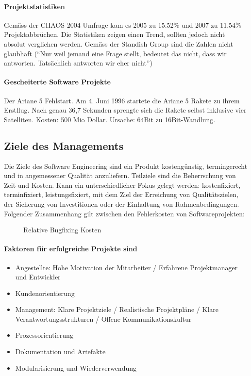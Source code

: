 \paragraph{Projektstatistiken}
Gemäss der CHAOS 2004 Umfrage kam es 2005 zu 15.52\% und 2007 zu 11.54\% Projektabbrüchen. Die Statistiken zeigen einen Trend, sollten jedoch nicht absolut verglichen werden. Gemäss der Standish Group sind die Zahlen nicht glaubhaft (``Nur weil jemand eine Frage stellt, bedeutet das nicht, dass wir antworten. Tatsächlich antworten wir eher nicht'')


\paragraph{Gescheiterte Software Projekte}
Der Ariane 5 Fehlstart.
Am 4. Juni 1996 startete die Ariane 5 Rakete zu ihrem Erstflug. Nach genau 36,7 Sekunden sprengte sich die Rakete selbst inklusive vier Satelliten. Kosten: 500 Mio Dollar. Ursache: 64Bit zu 16Bit-Wandlung.

\subsection{Ziele des Managements}
Die Ziele des Software Engineering sind ein Produkt kostengünstig, termingerecht und in angemessener Qualität anzuliefern. Teilziele sind die Beherrschung von Zeit und Kosten. Kann ein unterschiedlicher Fokus gelegt werden: kostenfixiert, terminfixiert, leistungsfixiert, mit dem Ziel der Erreichung von Qualitätszielen, der Sicherung von Investitionen oder der Einhaltung von Rahmenbedingungen. Folgender Zusammenhang gilt zwischen den Fehlerkosten von Softwareprojekten:
\begin{figure}[hb]
    \centering
\caption[]{Relative Bugfixing Kosten}
\end{figure}

\paragraph{Faktoren für erfolgreiche Projekte sind}
\begin{itemize}
    \item Angestellte: Hohe Motivation der Mitarbeiter / Erfahrene  Projektmanager und Entwickler 
    \item Kundenorientierung 
    \item Management: Klare Projektziele / Realistische Projektpläne / Klare Verantwortungsstrukturen / Offene Kommunikationskultur 
    \item Prozessorientierung 
    \item Dokumentation und Artefakte 
    \item Modularisierung und Wiederverwendung
\end{itemize}


